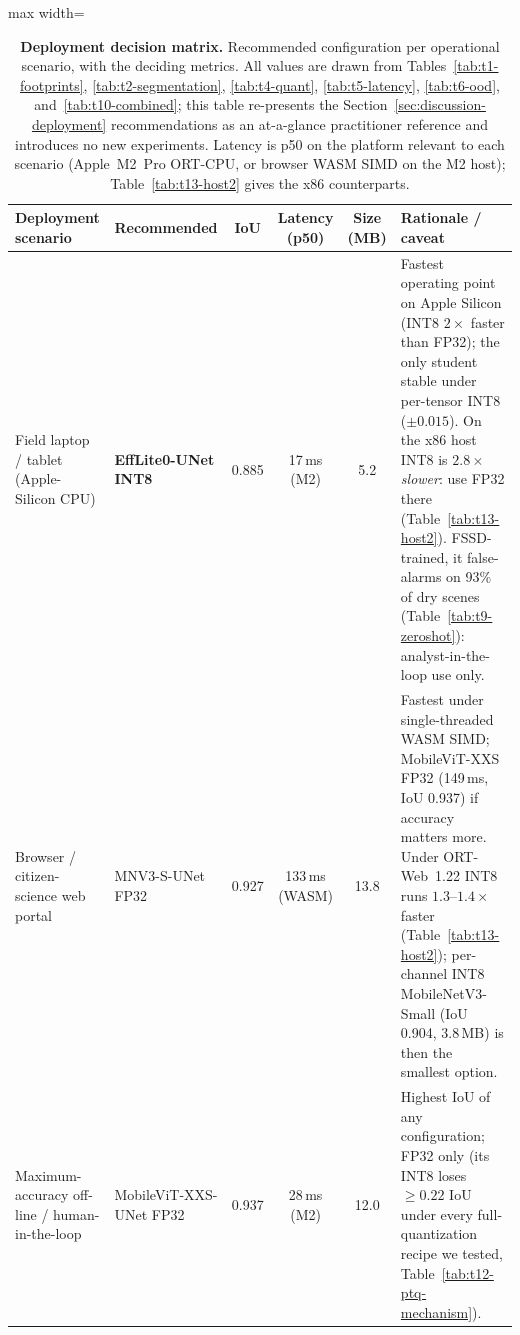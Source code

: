 \begin{table}[ht]
\centering
\caption{\textbf{Deployment decision matrix.} Recommended configuration per operational scenario, with the deciding metrics. All values are drawn from Tables~\ref{tab:t1-footprints}, \ref{tab:t2-segmentation}, \ref{tab:t4-quant}, \ref{tab:t5-latency}, \ref{tab:t6-ood}, and~\ref{tab:t10-combined}; this table re-presents the Section~\ref{sec:discussion-deployment} recommendations as an at-a-glance practitioner reference and introduces no new experiments. Latency is p50 on the platform relevant to each scenario (Apple~M2~Pro ORT-CPU, or browser WASM SIMD on the M2 host); Table~\ref{tab:t13-host2} gives the x86 counterparts.}
\label{tab:t7-decision}
\small
\setlength{\tabcolsep}{4pt}
\begin{adjustbox}{max width=\textwidth}
\begin{tabular}{p{2.9cm}lcccp{6.2cm}}
\toprule
\textbf{Deployment scenario} & \textbf{Recommended} & \textbf{IoU} & \textbf{Latency (p50)} & \textbf{Size (MB)} & \textbf{Rationale / caveat} \\
\midrule
Field laptop / tablet (Apple-Silicon CPU)
  & \textbf{EffLite0-UNet INT8} & 0.885 & 17\,ms (M2) & 5.2
  & Fastest operating point on Apple Silicon (INT8 $2\times$ faster than FP32); the only student stable under per-tensor INT8 ($\pm 0.015$). On the x86 host INT8 is $2.8\times$ \emph{slower}: use FP32 there (Table~\ref{tab:t13-host2}). FSSD-trained, it false-alarms on 93\% of dry scenes (Table~\ref{tab:t9-zeroshot}): analyst-in-the-loop use only. \\
\addlinespace
Browser / citizen-science web portal
  & MNV3-S-UNet FP32 & 0.927 & 133\,ms (WASM) & 13.8
  & Fastest under single-threaded WASM SIMD; MobileViT-XXS FP32 (149\,ms, IoU 0.937) if accuracy matters more. Under ORT-Web~1.22 INT8 runs $1.3$--$1.4\times$ faster (Table~\ref{tab:t13-host2}); per-channel INT8 MobileNetV3-Small (IoU 0.904, 3.8\,MB) is then the smallest option. \\
\addlinespace
Maximum-accuracy off-line / human-in-the-loop
  & MobileViT-XXS-UNet FP32 & 0.937 & 28\,ms (M2) & 12.0
  & Highest IoU of any configuration; FP32 only (its INT8 loses $\geq 0.22$ IoU under every full-quantization recipe we tested, Table~\ref{tab:t12-ptq-mechanism}). \\

\end{tabular}
\end{adjustbox}
\end{table}

